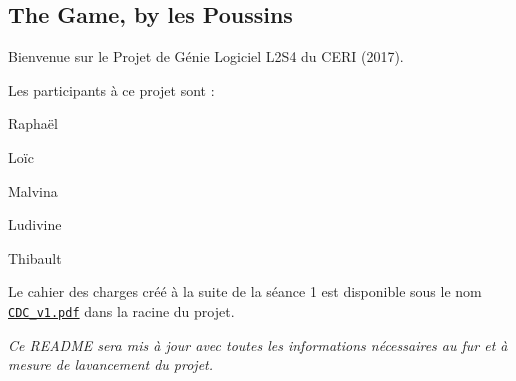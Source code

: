 \subsection*{The Game, by les Poussins }

Bienvenue sur le Projet de Génie Logiciel L2\+S4 du C\+E\+RI (2017).

Les participants à ce projet sont \+:
\begin{DoxyItemize}
\item Raphaël
\item Loïc
\item Malvina
\item Ludivine
\item Thibault
\end{DoxyItemize}

Le cahier des charges créé à la suite de la séance 1 est disponible sous le nom \href{docs/CDC_v1.pdf}{\tt C\+D\+C\+\_\+v1.\+pdf} dans la racine du projet.

{\itshape Ce R\+E\+A\+D\+ME sera mis à jour avec toutes les informations nécessaires au fur et à mesure de l\textquotesingle{}avancement du projet.} 